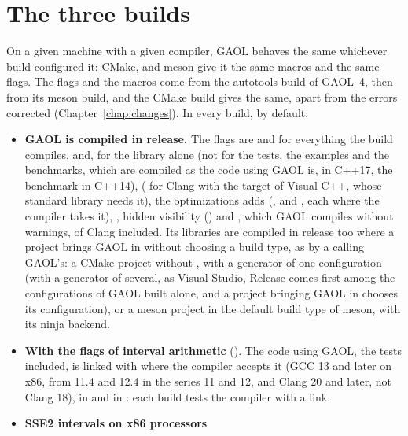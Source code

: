 \section{The three builds}\label{sec:three-builds}

On a given machine with a given compiler, GAOL behaves the same whichever
build configured it: CMake,  and meson give it the same macros
and the same flags. The flags and the macros come from the autotools build of GAOL~4, then from
its meson build, and the CMake build gives the same, apart from the errors corrected
(Chapter~\ref{chap:changes}). In every build, by default:

\begin{itemize}
\item[$\bullet$] \textbf{GAOL is compiled in release.} The flags are
   and  for everything the build compiles, and, for
  the library alone (not for the tests, the examples and the benchmarks, which
  are compiled as the code using GAOL is, in C++17, the benchmark in C++14),
   ( for Clang with the target of Visual
  C++, whose standard library needs it), the optimizations  adds (,
   and ,
  each where the compiler takes it), , hidden
  visibility () and
  , which GAOL compiles without warnings,
   of Clang included. Its libraries are compiled in
  release too where a project brings GAOL in without choosing a build type, as
  by a  calling GAOL's: a CMake project without
  , with a generator of one configuration (with a
  generator of several, as Visual Studio, Release comes first among the
  configurations of GAOL built alone, and a project bringing GAOL in chooses
  its configuration), or a meson project in the default build type of meson,
  with its ninja backend.\newinvfive
\item[$\bullet$] \textbf{With the flags of interval arithmetic}
  (). The code using GAOL, the tests included, is linked
  with  where the compiler accepts it (GCC 13 and later
  on x86, from 11.4 and 12.4 in the series 11 and 12, and Clang 20 and later,
  not Clang 18), in  and in : each build tests the compiler with
  a link.\newinvfive
\item[$\bullet$] \textbf{SSE2 intervals on x86 processors}

\end{itemize}
